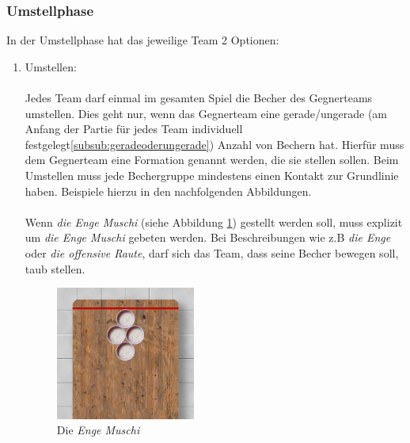 \documentclass[a5paper, 12pt]{book}
\begin{document}
\subsubsection{Umstellphase}\label{subsub:umstellphase}
In der Umstellphase hat das jeweilige Team 2 Optionen:
\begin{enumerate}[(1)]
    \item Umstellen: \\\\
    Jedes Team darf einmal im gesamten Spiel die Becher des Gegnerteams umstellen. Dies geht nur, wenn das Gegnerteam eine gerade/ungerade (am Anfang der Partie für jedes Team individuell festgelegt\ref{subsub:geradeoderungerade}) Anzahl von Bechern hat. Hierfür muss dem Gegnerteam eine Formation genannt werden, die sie stellen sollen. Beim Umstellen muss jede Bechergruppe mindestens einen Kontakt zur Grundlinie haben. Beispiele hierzu in den nachfolgenden Abbildungen.\\\\
Wenn \textit{die Enge Muschi} (siehe Abbildung \ref{fig:enge-Muschi}) gestellt werden soll, muss explizit um \textit{die Enge Muschi} gebeten werden. Bei Beschreibungen wie z.B \textit{die Enge} oder \textit{die offensive Raute}, darf sich das Team, dass seine Becher bewegen soll, taub stellen. \\
\begin{figure} 
    \includegraphics[width=0.434\textwidth]{enge_muschi.png}
    \caption{Die \textit{Enge Muschi}}
    \label{fig:enge-Muschi}
\end{figure}
\begin{figure}[h!]
     \centering
     \begin{subfigure}[b]{0.434\textwidth}
         \centering

\end{subfigure}
\end{figure}
\end{enumerate}
\end{document}
